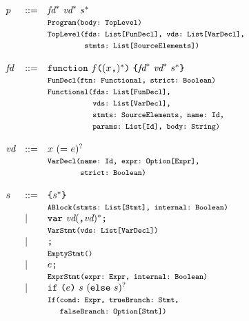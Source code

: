 \[
\begin{array}{llll}
\pgm & ::=  & \fd^*\ \vd^*\ \stmt^* \\
&& \mtt{Program(body:~TopLevel)}\\
    &&\mtt{TopLevel(fds:~List[FunDecl], vds:~List[VarDecl],}\\
&&\mtt{\phantom{TopLevel(}stmts:~List[SourceElements])}\\\\

\fd &::=& {\tt function} \ f \verb+(+(x\verb+,+)^*\verb+)+ \ \verb+{+\fd^*\ \vd^*\ \stmt^*\verb+}+\\
&& \mtt{FunDecl(ftn:~Functional, strict:~Boolean)}\\
&& \mtt{Functional(fds:~List[FunDecl],}\\
&&\mtt{\phantom{Functional(}vds:~List[VarDecl],}\\
&&\mtt{\phantom{Functional(}stmts:~SourceElements, name:~Id,}\\
&&\mtt{\phantom{Functional(}params:~List[Id], body:~String)}\\\\

\vd &::=& x \ ({\tt =} \ \expr)^? \\
&& \mtt{VarDecl(name:~Id, expr:~Option[Expr],}\\
&& \mtt{\phantom{VarDecl(}strict:~Boolean)}\\\\

\stmt &::=& \verb+{+\stmt^*\verb+}+ \\
&& \mtt{ABlock(stmts:~List[Stmt], internal:~Boolean)}\\
& \mid & {\tt var} \ \vd(\verb+,+ \vd)^* \verb+;+ \\
&& \mtt{VarStmt(vds:~List[VarDecl])}\\
& \mid & \verb+;+ \\
&& \mtt{EmptyStmt()}\\
& \mid & \expr \verb+;+ \\
&& \mtt{ExprStmt(expr:~Expr, internal:~Boolean)}\\
& \mid & {\tt if} \ \verb+(+\expr\verb+)+ \ \stmt \ ({\tt else} \ \stmt)^?\\
&& \mtt{If(cond:~Expr, trueBranch:~Stmt,}\\
&&\mtt{\phantom{If(}falseBranch:~Option[Stmt])}\\
\end{array}
\]

